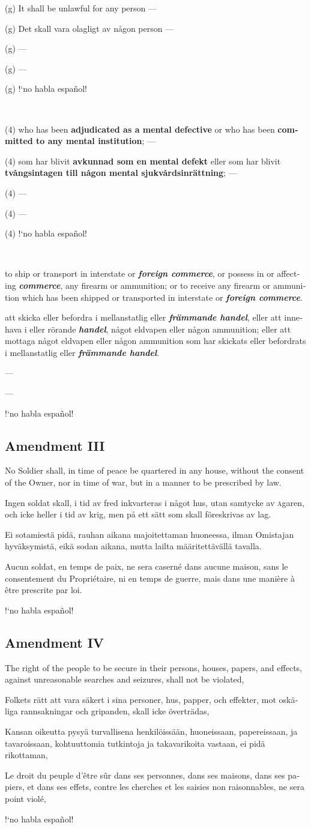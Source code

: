 \documentclass[a4paper,landscape,10pt]{article}
\newcommand{\tblock}[5]{\noindent\begin{minipage}[t]{0.18\textwidth}\foreignlanguage{english}{#1}\end{minipage}\hskip 0.025\textwidth\begin{minipage}[t]{0.18\textwidth}\foreignlanguage{swedish}{#2}\end{minipage}\hskip 0.025\textwidth\begin{minipage}[t]{0.18\textwidth}\foreignlanguage{finnish}{#3}\end{minipage}\hskip 0.025\textwidth\begin{minipage}[t]{0.18\textwidth}\foreignlanguage{french}{#4}\end{minipage}\hskip 0.025\textwidth\begin{minipage}[t]{0.18\textwidth}\foreignlanguage{spanish}{#5}\end{minipage}}
\begin{document}
\tblock
{(g) It shall be unlawful for any person ---}
{(g) Det skall vara olagligt av någon person ---}
{(g) ---}
{(g) ---}
{(g) !`no habla español!}

~

\tblock
{(4) who has been \textbf{adjudicated as a mental defective} or who has been \textbf{committed to any mental institution}; ---}
{(4) som har blivit \textbf{avkunnad som en mental defekt} eller som har blivit \textbf{tvångsintagen till någon mental sjukvårdsinrättning}; ---}
{(4) ---}
{(4) ---}
{(4) !`no habla español!}

~

\tblock
{to ship or transport in interstate or \textbf{\textit{foreign commerce}}, or possess in or affecting \textbf{\textit{commerce}}, any firearm or ammunition; or to receive any firearm or ammunition which has been shipped or transported in interstate or \textbf{\textit{foreign commerce}}.}
{att skicka eller befordra i mellanstatlig eller \textbf{\textit{främmande handel}}, eller att innehava i eller rörande \textbf{\textit{handel}}, något eldvapen eller någon ammunition; eller att mottaga något eldvapen eller någon ammunition som har skickats eller befordrats i mellanstatlig eller \textbf{\textit{främmande handel}}.}
{---}
{---}
{!`no habla español!}
\color{black}
\subsection*{Amendment III}
\tblock
{No Soldier shall, in time of peace be quartered in any house, without the consent of the Owner, nor in time of war, but in a manner to be prescribed by law.}
{Ingen soldat skall, i tid av fred inkvarteras i något hus, utan samtycke av \textsc{ä}garen, och icke heller i tid av krig, men på ett sätt som skall föreskrivas av lag.}
{Ei sotamiestä pidä, rauhan aikana majoitettaman huoneessa, ilman Omistajan hyväksymistä, eikä sodan aikana, mutta lailta määritettävällä tavalla.}
{Aucun soldat, en temps de paix, ne sera caserné dans aucune maison, sans le consentement du Propriétaire, ni en temps de guerre, mais dans une manière à être prescrite par loi.}
{!`no habla español!}

\subsection*{Amendment IV}
\tblock
{The right of the people to be secure in their persons, houses, papers, and effects, against unreasonable searches and seizures, shall not be violated,}
{Folkets rätt att vara säkert i sina personer, hus, papper, och effekter, mot oskäliga rannsakningar och gripanden, skall icke överträdas,}
{Kansan oikeutta pysyä turvallisena henkilöissään, huoneissaan, papereissaan, ja tavaroissaan, kohtuuttomia tutkintoja ja takavarikoita vastaan, ei pidä rikottaman,}
{Le droit du peuple d'être sûr dans ses personnes, dans ses maisons, dans ses papiers, et dans ses effets, contre les cherches et les saisies non raisonnables, ne sera point violé,}
{!`no habla español!}
\end{document}
